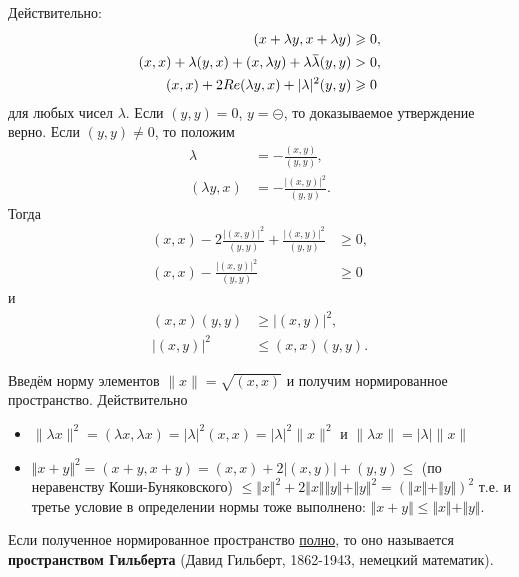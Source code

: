 \documentclass[12pt,a4paper,titlepage,oneside]{book}
\newcommand{\overbar}[1]{\mkern 1.5mu\overline{\mkern-1.5mu#1\mkern-1.5mu}\mkern 1.5mu}
\theoremstyle{definition}
\theoremstyle{plain}
\theoremstyle{remark}
\theoremstyle{remark}
\theoremstyle{remark}
\theoremstyle{remark}
\theoremstyle{plain}
\theoremstyle{plain}
\begin{document}
Действительно:
\begin{align*}
(x + \lambda y, x + \lambda y) &\geqslant 0,\\
(x, x) + \lambda (y, x) + (x, \lambda y) + \lambda \overbar{\lambda} (y, y) &> 0,\\
(x,x) + 2 Re(\lambda y, x) + \lvert \lambda \rvert^2 (y, y) &\geqslant 0\\
\end{align*}
для любых чисел $\lambda$.
Если $(y, y) = 0$, $y = \circleddash$, то доказываемое утверждение верно. Если $(y, y) \neq 0$, то положим 
\begin{align*}
\lambda &= - \frac{(x, y)}{(y, y)},\\
(\lambda y, x) &= - \frac{ \lvert (x, y)\rvert^2}{(y, y)}.
\end{align*}
Тогда
\begin{align*}
(x, x) - 2 \frac{ \lvert (x, y) \rvert^2}{(y, y)} + \frac{\lvert (x, y) \rvert^2}{(y, y)} &\geqslant 0,\\
(x, x) - \frac{\lvert (x, y) \rvert^2}{(y, y)} &\geqslant 0
\end{align*}
и
\begin{align*}
(x, x) (y, y) &\geqslant \lvert (x, y) \rvert^2,\\
\lvert (x, y) \rvert^2 &\leqslant (x, x) (y, y).
\end{align*}

Введём норму элементов $\lVert x \rVert = \sqrt{(x, x)}$ и получим нормированное пространство. Действительно

\begin{itemize}

	\item $\lVert \lambda x \rVert^2 = (\lambda x, \lambda x) = \lvert \lambda \rvert^2 (x, x) = \lvert \lambda \rvert^2 \lVert x \rVert^2$ и $\lVert \lambda x \rVert = \lvert \lambda \rvert \lVert x \rVert$
	
	\item $\Vert x + y \Vert^2 = (x + y, x + y) = (x, x) + 2 \lvert (x, y) \rvert + (y, y) \leqslant$ (по неравенству Коши-Буняковского) $\leqslant \Vert x \Vert^2 + 2 \Vert x \Vert \Vert y \Vert + \Vert y \Vert^2 = (\Vert x \Vert + \Vert y \Vert)^2$ т.е. и третье условие в определении нормы тоже выполнено: $\Vert x + y \Vert \leqslant \Vert x \Vert + \Vert y \Vert$.

\end{itemize}

Если полученное нормированное пространство \underline{полно}, то оно называется \textbf{пространством Гильберта} (Давид Гильберт, 1862-1943, немецкий математик).
\end{document}

